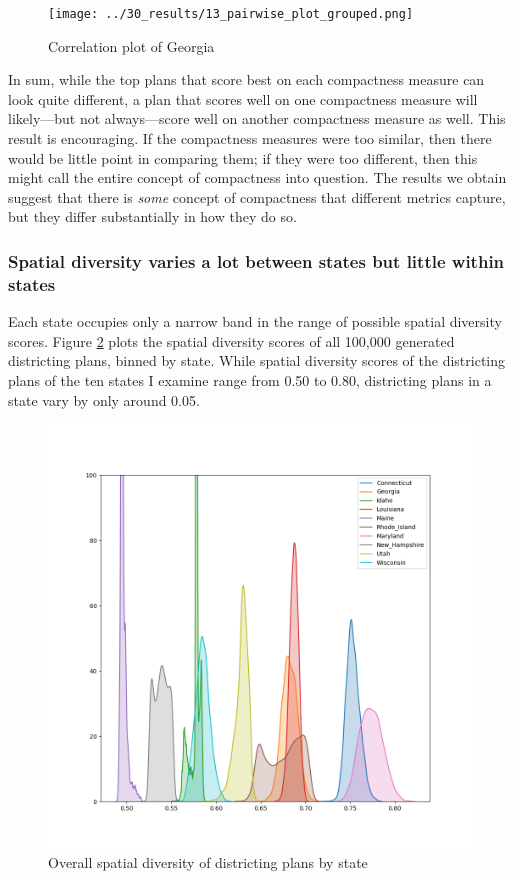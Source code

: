 \documentclass[]{article}
\begin{document}
\begin{figure}
\centering
\texttt{[image: ../30\_results/13\_pairwise\_plot\_grouped.png]}
\caption{Correlation plot of Georgia\label{pairwise_plot_grouped}}
\end{figure}

In sum, while the top plans that score best on each compactness measure
can look quite different, a plan that scores well on one compactness
measure will likely---but not always---score well on another compactness
measure as well. This result is encouraging. If the compactness measures
were too similar, then there would be little point in comparing them; if
they were too different, then this might call the entire concept of
compactness into question. The results we obtain suggest that there is
\emph{some} concept of compactness that different metrics capture, but
they differ substantially in how they do so.

\hypertarget{spatial-diversity-varies-a-lot-between-states-but-little-within-states}{%
\subsubsection{Spatial diversity varies a lot between states but little
within
states}\label{spatial-diversity-varies-a-lot-between-states-but-little-within-states}}

Each state occupies only a narrow band in the range of possible spatial
diversity scores. Figure \ref{sd_plans} plots the spatial diversity
scores of all 100,000 generated districting plans, binned by state.
While spatial diversity scores of the districting plans of the ten
states I examine range from 0.50 to 0.80, districting plans in a state
vary by only around 0.05.

\begin{figure}
\centering
\includegraphics{../30_results/all_plans_sd.png}
\caption{Overall spatial diversity of districting plans by state
\label{sd_plans}}
\end{figure}
\end{document}
